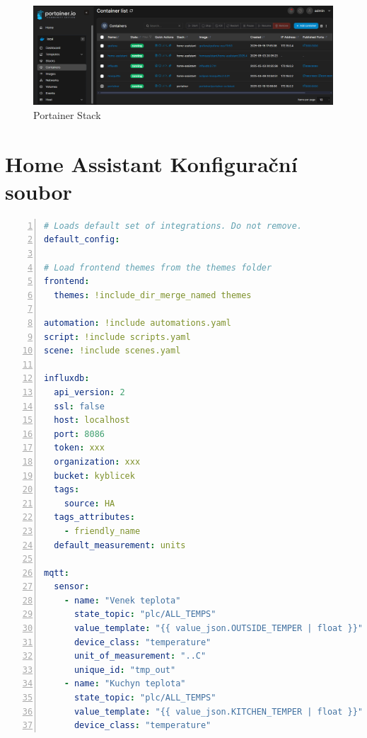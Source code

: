 \begin{figure}[!ht]
  \begin{center}
  \includegraphics[scale=0.4]{obrazky/portainer.png}
  \end{center}
  \caption[Portainer Stack]{Portainer Stack}
  \label{fig:portainer}
\end{figure}
\chapter{Home Assistant Konfigurační soubor}
\label{apend:configyaml}
\begin{lstlisting}[language=YAML, breaklines=true, numbers=left, numberstyle=\small, numbersep=10pt, frame=single, basicstyle=\ttfamily\small, caption={Home Assistant configuration.yaml}, label={lst:configyaml}]
# Loads default set of integrations. Do not remove.            
default_config:

# Load frontend themes from the themes folder                  
frontend:                                                      
  themes: !include_dir_merge_named themes

automation: !include automations.yaml
script: !include scripts.yaml                    
scene: !include scenes.yaml                                    

influxdb:
  api_version: 2           
  ssl: false
  host: localhost                                              
  port: 8086                                                   
  token: xxx
  organization: xxx                                
  bucket: kyblicek                                             
  tags:                                                        
    source: HA                                                 
  tags_attributes:                                              
    - friendly_name                                             
  default_measurement: units                                   

mqtt:
  sensor:
    - name: "Venek teplota"
      state_topic: "plc/ALL_TEMPS"
      value_template: "{{ value_json.OUTSIDE_TEMPER | float }}"
      device_class: "temperature"
      unit_of_measurement: "..C"
      unique_id: "tmp_out"
    - name: "Kuchyn teplota"
      state_topic: "plc/ALL_TEMPS"                             
      value_template: "{{ value_json.KITCHEN_TEMPER | float }}"
      device_class: "temperature"
\end{lstlisting}

